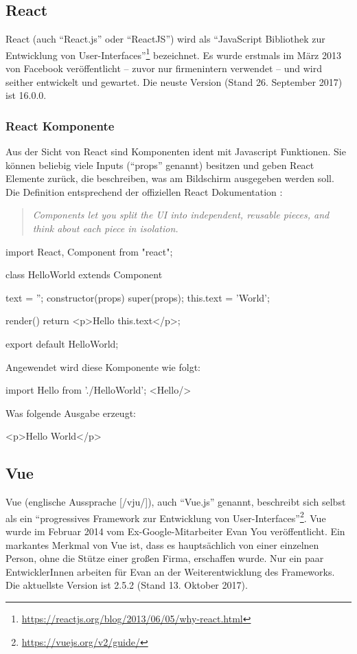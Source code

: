 \subsection{React}
React (auch "`React.js"' oder "`ReactJS"') wird als "`JavaScript Bibliothek zur Entwicklung von User-Interfaces"'\footnote{\url{https://reactjs.org/blog/2013/06/05/why-react.html}} bezeichnet. Es wurde erstmals im März 2013 von Facebook veröffentlicht -- zuvor nur firmenintern verwendet -- und wird seither entwickelt und gewartet. Die neuste Version (Stand 26. September 2017) ist 16.0.0.

\subsubsection{React Komponente}
Aus der Sicht von React sind Komponenten ident mit Javascript Funktionen. Sie können beliebig viele Inputs ("`props"' genannt) besitzen und geben React Elemente zurück, die beschreiben, was am Bildschirm ausgegeben werden soll.
Die Definition entsprechend der offiziellen React Dokumentation \cite{react-component}: 
\begin{quote}
	\begin{english}
		\textit{Components let you split the UI into independent, reusable pieces, and think about each piece in isolation.}
	\end{english}
\end{quote}

\begin{JsCode}
	import React, {Component} from "react";
	
	class HelloWorld extends Component {
		text = '';
		constructor(props) {
			super(props);
			this.text = 'World';
		}
		
		render() {
			return <p>Hello {this.text}</p>;
		}
	}
	export default HelloWorld;
\end{JsCode}
Angewendet wird diese Komponente wie folgt:
\begin{JsCode}[numbers=none]
	import Hello from './HelloWorld';
	<Hello/>
\end{JsCode}
Was folgende Ausgabe erzeugt:
\begin{JsCode}Hello World</p>
\end{JsCode}

\subsection{Vue }
Vue (englische Aussprache [/vju/]), auch "`Vue.js"' genannt, beschreibt sich selbst als ein "`progressives Framework zur Entwicklung von User-Interfaces"'\footnote{\url{https://vuejs.org/v2/guide/}}. Vue wurde im Februar 2014 vom Ex-Google-Mitarbeiter Evan You veröffentlicht. Ein markantes Merkmal von Vue ist, dass es hauptsächlich von einer einzelnen Person, ohne die Stütze einer großen Firma, erschaffen wurde. Nur ein paar EntwicklerInnen arbeiten für Evan an der Weiterentwicklung des Frameworks. Die aktuellste Version ist 2.5.2 (Stand 13. Oktober 2017).

